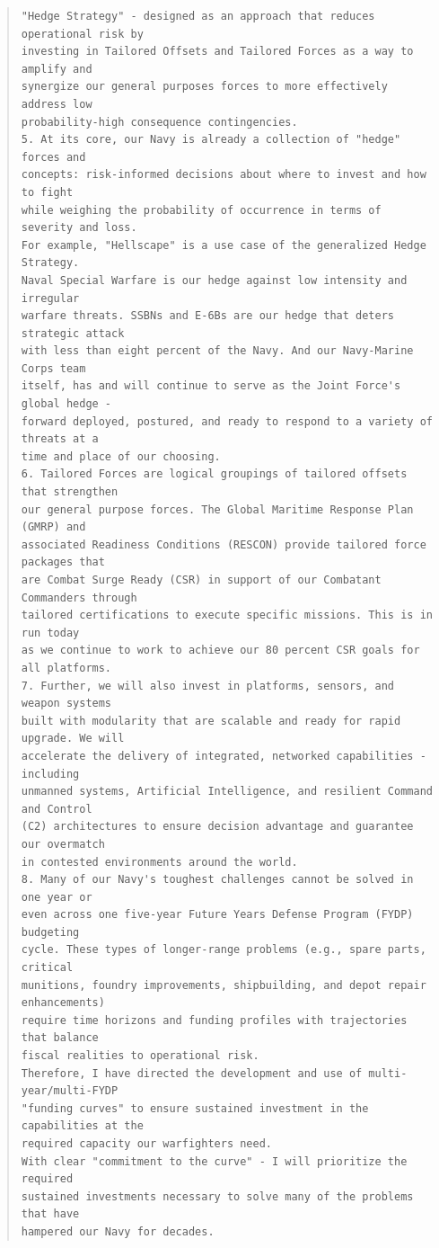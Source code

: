 \documentclass[../main.tex]{subfiles}
\begin{document}
\begin{quote}
\begin{verbatim}
"Hedge Strategy" - designed as an approach that reduces operational risk by
investing in Tailored Offsets and Tailored Forces as a way to amplify and
synergize our general purposes forces to more effectively address low
probability-high consequence contingencies.
5. At its core, our Navy is already a collection of "hedge" forces and
concepts: risk-informed decisions about where to invest and how to fight
while weighing the probability of occurrence in terms of severity and loss.
For example, "Hellscape" is a use case of the generalized Hedge Strategy.
Naval Special Warfare is our hedge against low intensity and irregular
warfare threats. SSBNs and E-6Bs are our hedge that deters strategic attack
with less than eight percent of the Navy. And our Navy-Marine Corps team
itself, has and will continue to serve as the Joint Force's global hedge -
forward deployed, postured, and ready to respond to a variety of threats at a
time and place of our choosing.
6. Tailored Forces are logical groupings of tailored offsets that strengthen
our general purpose forces. The Global Maritime Response Plan (GMRP) and
associated Readiness Conditions (RESCON) provide tailored force packages that
are Combat Surge Ready (CSR) in support of our Combatant Commanders through
tailored certifications to execute specific missions. This is in run today
as we continue to work to achieve our 80 percent CSR goals for all platforms.
7. Further, we will also invest in platforms, sensors, and weapon systems
built with modularity that are scalable and ready for rapid upgrade. We will
accelerate the delivery of integrated, networked capabilities - including
unmanned systems, Artificial Intelligence, and resilient Command and Control
(C2) architectures to ensure decision advantage and guarantee our overmatch
in contested environments around the world.
8. Many of our Navy's toughest challenges cannot be solved in one year or
even across one five-year Future Years Defense Program (FYDP) budgeting
cycle. These types of longer-range problems (e.g., spare parts, critical
munitions, foundry improvements, shipbuilding, and depot repair enhancements)
require time horizons and funding profiles with trajectories that balance
fiscal realities to operational risk.
Therefore, I have directed the development and use of multi-year/multi-FYDP
"funding curves" to ensure sustained investment in the capabilities at the
required capacity our warfighters need.
With clear "commitment to the curve" - I will prioritize the required
sustained investments necessary to solve many of the problems that have
hampered our Navy for decades.

\end{verbatim}
\end{quote}
\end{document}
